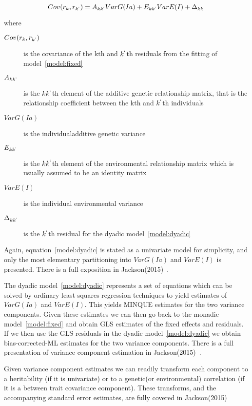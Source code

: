 \documentclass[titlepage]{article}  %
\begin{document}
\begin{equation}
\label{model:dyadic}
Cov(r_{k},r_{k^{`}}) = A_{kk^{`}} VarG(Ia) + E_{kk^{`}} VarE(I) + \Delta_{kk^{`}}
\end{equation}

where
\begin{description}
\item[$Cov(r_{k},r_{k^{`}})$] is the covariance of the kth and $k^{`}$th residuals from the fitting of model~\ref{model:fixed}
\item[$A_{kk^{`}}$] is the $kk^{`}$th element of the additive genetic relationship matrix, that is the relationship coefficient between the kth and $k^{`}$th individuals
\item[$VarG(Ia)$] is the individualadditive genetic variance
\item[$E_{kk^{`}}$] is the $kk^{`}$th element of the environmental relationship matrix which is usually assumed to be an identity matrix
\item[$VarE(I)$] is the individual environmental variance
\item[$\Delta_{kk^{`}}$] is the $k^{`}$th residual for the dyadic model~\ref{model:dyadic}
\end{description}

Again, equation~\ref{model:dyadic} is stated as a univariate model for simplicity, and only the most elementary partitioning into $VarG(Ia)$ and $VarE(I)$ is presented. There is a full exposition in Jackson(2015)~\cite{jack:15b}. 

 The dyadic model~\ref{model:dyadic} represents a set of equations which can be solved by ordinary least squares regression techniques to yield estimates of $VarG(Ia)$  and $VarE(I)$. This yields MINQUE estimates for the two variance components. Given these estimates we can then go back to the monadic model~\ref{model:fixed} and obtain GLS estimates of the fixed effects and residuals. If we then use the GLS residuals in the dyadic model~\ref{model:dyadic} we obtain bias-corrected-ML estimates for the two variance components. There is a full presentation of variance component estimation in Jackson(2015)~\cite{jack:15b}.

Given variance component estimates we can readily transform each component to a heritability (if it is univariate) or to a genetic(or environmental) correlation (if it is a between trait covariance component). These transforms, and the accompanying standard error estimates, are fully covered in Jackson(2015)~\cite{jack:15b}
\end{document}
